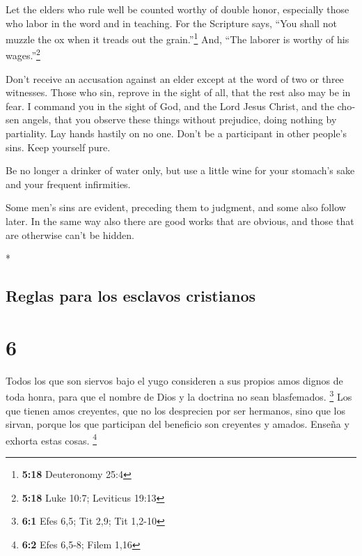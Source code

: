 \begin{paracol}{2}
\begin{otherlanguage}{english}
 Let the elders who rule well be counted worthy of double
honor, especially those who labor in the word and in teaching.
 For the Scripture says, ``You shall not muzzle the ox
when it treads out the grain.''\footnote{\textbf{5:18} Deuteronomy 25:4}
And, ``The laborer is worthy of his wages.''\footnote{\textbf{5:18} Luke
  10:7; Leviticus 19:13}

 Don't receive an accusation against an elder except at
the word of two or three witnesses.  Those who sin,
reprove in the sight of all, that the rest also may be in fear.
 I command you in the sight of God, and the Lord Jesus
Christ, and the chosen angels, that you observe these things without
prejudice, doing nothing by partiality.  Lay hands
hastily on no one. Don't be a participant in other people's sins. Keep
yourself pure.

 Be no longer a drinker of water only, but use a little
wine for your stomach's sake and your frequent infirmities.

 Some men's sins are evident, preceding them to judgment,
and some also follow later.  In the same way also there
are good works that are obvious, and those that are otherwise can't be
hidden.

\end{otherlanguage}

\switchcolumn[0]*

\hypertarget{reglas-para-los-esclavos-cristianos}{%
\subsection{Reglas para los esclavos
cristianos}\label{reglas-para-los-esclavos-cristianos}}

\hypertarget{section-10}{%
\section{6}\label{section-10}}

 Todos los que son siervos bajo el yugo consideren a sus
propios amos dignos de toda honra, para que el nombre de Dios y la
doctrina no sean blasfemados. \footnote{\textbf{6:1} Efes 6,5; Tit 2,9;
  Tit 1,2-10}  Los que tienen amos creyentes, que no los
desprecien por ser hermanos, sino que los sirvan, porque los que
participan del beneficio son creyentes y amados. Enseña y exhorta estas
cosas. \footnote{\textbf{6:2} Efes 6,5-8; Filem 1,16}


\end{paracol}
